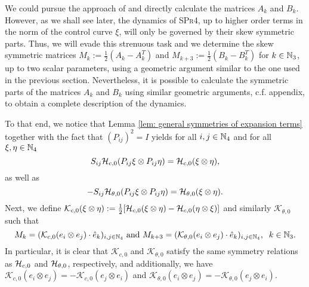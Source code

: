 We could pursue the approach of \cite{Alouges2017} and directly calculate the matrices $A_k$ and $B_k$. However, as we shall see later, the dynamics of \textsc{SPr4}, up to higher order terms in the norm of the control curve $\xi$, will only be governed by their skew symmetric parts. Thus, we will evade this strenuous task and we determine the skew symmetric matrices $M_k := \tfrac{1}{2}(A_k - A_k^T)$ and $M_{k + 3}:= \tfrac{1}{2}(B_k - B_k^T)$ for $k \in \mathbb{N}_3$, up to two scalar parameters, using a geometric argument similar to the one used in the previous section. Nevertheless, it is possible to calculate the symmetric parts of the matrices $A_k$ and $B_k$ using similar geometric arguments, c.f. appendix, to obtain a complete description of the dynamics.


To that end, we notice that Lemma \ref{lem: general symmetries of expansion terms} together with the fact that $(P_{ij})^2 = I$ yields for all $i,j \in \mathbb{N}_4$ and for all $\xi, \eta \in \mathbb{N}_4$
\begin{equation}
	S_{ij} \mathcal{H}_{c,0}(P_{ij} \xi \otimes P_{ij} \eta) = \mathcal{H}_{c,0}(\xi \otimes \eta),
\end{equation}
as well as
\begin{equation}
	-S_{ij} \mathcal{H}_{\theta,0}(P_{ij} \xi \otimes P_{ij} \eta) = \mathcal{H}_{\theta, 0}(\xi \otimes \eta).
\end{equation}
Next, we define $\mathcal{K}_{c,0}(\xi \otimes \eta) := \tfrac{1}{2}[\mathcal{H}_{c,0}(\xi \otimes \eta) - \mathcal{H}_{c,0}(\eta \otimes \xi)]$ and similarly $\mathcal{K}_{\theta,0}$ such that
\begin{equation}
	M_k = (\mathcal{K}_{c,0}(e_i \otimes e_j) \cdot \hat{e}_k)_{i,j \in \mathbb{N}_4} \text{ and } M_{k + 3} = (\mathcal{K}_{\theta,0}(e_i \otimes e_j) \cdot \hat{e}_k)_{i,j \in \mathbb{N}_4},\;\; k \in \mathbb{N}_3.
\end{equation} 
In particular, it is clear that $\mathcal{K}_{c,0}$ and $\mathcal{K}_{\theta,0}$ satisfy the same symmetry relations as $\mathcal{H}_{c,0}$ and $\mathcal{H}_{\theta, 0}$, respectively, and additionally, we have $\mathcal{K}_{c,0}(e_i \otimes e_j) = - \mathcal{K}_{c,0}(e_j \otimes e_i)$ and $\mathcal{K}_{\theta,0}(e_i \otimes e_j) = - \mathcal{K}_{\theta,0}(e_j \otimes e_i)$.

